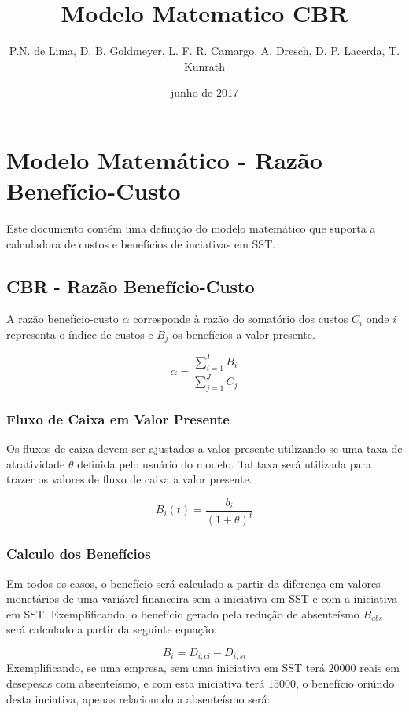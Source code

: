 \documentclass[]{article}
\title{Modelo Matematico CBR}
\author{P.N. de Lima, D. B. Goldmeyer, L. F. R. Camargo, A. Dresch, D. P.
Lacerda, T. Kunrath}
\date{junho de 2017}
\begin{document}
\maketitle

{
\setcounter{tocdepth}{6}
\tableofcontents
}
\section{Modelo Matemático - Razão
Benefício-Custo}\label{modelo-matematico---razao-beneficio-custo}

Este documento contém uma definição do modelo matemático que suporta a
calculadora de custos e benefícios de inciativas em SST.

\subsection{CBR - Razão
Benefício-Custo}\label{cbr---razao-beneficio-custo}

A razão benefício-custo \(\alpha\) corresponde à razão do somatório dos
custos \(C_i\) onde \(i\) representa o índice de custos e \(B_j\) os
benefícios a valor presente.

\[\alpha = \frac{\sum_{i=1}^{I} B_{i}} {\sum_{j=1}^{J} C_{j}}\]

\subsubsection{Fluxo de Caixa em Valor
Presente}\label{fluxo-de-caixa-em-valor-presente}

Os fluxos de caixa devem ser ajustados a valor presente utilizando-se
uma taxa de atratividade \(\theta\) definida pelo usuário do modelo. Tal
taxa será utilizada para trazer os valores de fluxo de caixa a valor
presente.

\[B_i(t) = \frac{b_i}{(1+\theta)^t}\]

\subsubsection{Calculo dos Benefícios}\label{calculo-dos-beneficios}

Em todos os casos, o benefício será calculado a partir da diferença em
valores monetários de uma variável financeira sem a iniciativa em SST e
com a iniciativa em SST. Exemplificando, o benefício gerado pela redução
de absenteísmo \(B_{abs}\) será calculado a partir da seguinte equação.

\[B_i = {D}_{i, ci} - {D}_{i, si}\] Exemplificando, se uma empresa, sem
uma iniciativa em SST terá \(20000\) reais em desepesas com absenteísmo,
e com esta iniciativa terá \(15000\), o benefício oriúndo desta
inciativa, apenas relacionado a absenteísmo será:
\end{document}
